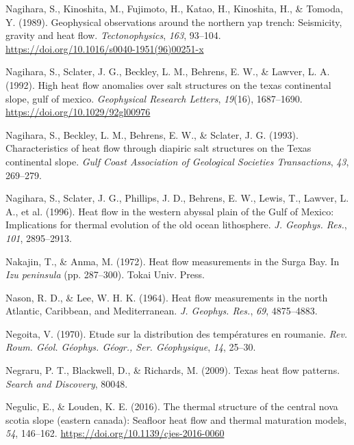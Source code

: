 \begin{CSLReferences}{1}{1}
\leavevmode{}%
Nagihara, S., Kinoshita, M., Fujimoto, H., Katao, H., Kinoshita, H., \& Tomoda, Y. (1989). Geophysical observations around the northern yap trench: Seismicity, gravity and heat flow. \emph{Tectonophysics}, \emph{163}, 93--104. \url{https://doi.org/10.1016/s0040-1951(96)00251-x}

\leavevmode{}%
Nagihara, S., Sclater, J. G., Beckley, L. M., Behrens, E. W., \& Lawver, L. A. (1992). High heat flow anomalies over salt structures on the texas continental slope, gulf of mexico. \emph{Geophysical Research Letters}, \emph{19}(16), 1687--1690. \url{https://doi.org/10.1029/92gl00976}

\leavevmode{}%
Nagihara, S., Beckley, L. M., Behrens, E. W., \& Sclater, J. G. (1993). Characteristics of heat flow through diapiric salt structures on the {Texas} continental slope. \emph{Gulf Coast Association of Geological Societies Transactions}, \emph{43}, 269--279.

\leavevmode{}%
Nagihara, S., Sclater, J. G., Phillips, J. D., Behrens, E. W., Lewis, T., Lawver, L. A., et al. (1996). Heat flow in the western abyssal plain of the {Gulf of Mexico}: Implications for thermal evolution of the old ocean lithosphere. \emph{J. Geophys. Res.}, \emph{101}, 2895--2913.

\leavevmode{}%
Nakajin, T., \& Anma, M. (1972). Heat flow measurements in the {Surga Bay}. In \emph{Izu peninsula} (pp. 287--300). Tokai Univ. Press.

\leavevmode{}%
Nason, R. D., \& Lee, W. H. K. (1964). Heat flow measurements in the north {Atlantic, Caribbean, and Mediterranean}. \emph{J. Geophys. Res.}, \emph{69}, 4875--4883.

\leavevmode{}%
Negoita, V. (1970). Etude sur la distribution des températures en roumanie. \emph{Rev. Roum. Géol. Géophys. Géogr., Ser. Géophysique}, \emph{14}, 25--30.

\leavevmode{}%
Negraru, P. T., Blackwell, D., \& Richards, M. (2009). Texas heat flow patterns. \emph{Search and Discovery}, 80048.

\leavevmode{}%
Negulic, E., \& Louden, K. E. (2016). The thermal structure of the central nova scotia slope (eastern canada): Seafloor heat flow and thermal maturation models, \emph{54}, 146--162. \url{https://doi.org/10.1139/cjes-2016-0060}


\end{CSLReferences}
